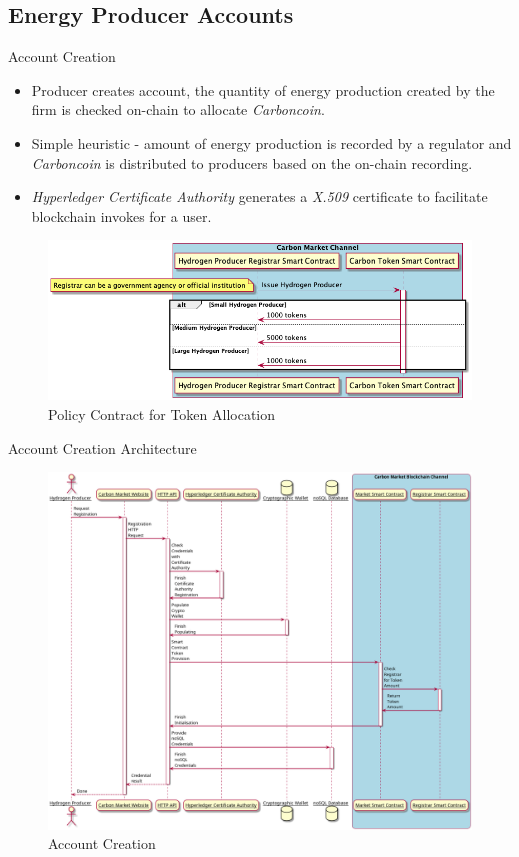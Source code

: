 \subsection{Energy Producer Accounts}
\begin{frame}{Account Creation}
    \begin{itemize}
        \item Producer creates account, the quantity of energy
              production created by the firm
              is checked on-chain to allocate \textit{Carboncoin}.
        \item Simple heuristic - amount of energy production is recorded
              by a regulator and \textit{Carboncoin} is distributed to
              producers based on the on-chain recording.
        \item \textit{Hyperledger Certificate Authority} generates a
              \textit{X.509} certificate to facilitate blockchain invokes
              for a user.
    \end{itemize}
    \begin{figure}
        \caption{Policy Contract for Token Allocation}
        \centering
        \includegraphics[height=0.3\textwidth, width=0.8\textheight]
        {figures/chain.png}
    \end{figure}
\end{frame}
\begin{frame}{Account Creation Architecture}
    \begin{figure}
        \caption{Account Creation}
        \centering
        \includegraphics[height=0.6\textheight, width=0.7\linewidth]
        {figures/AccountCreation.png}
    \end{figure}
\end{frame}
